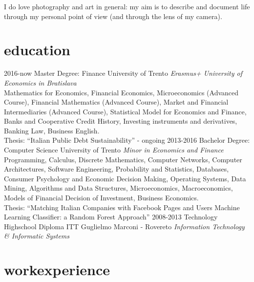 \documentclass[]{friggeri-cv}
\begin{document}
I do love photography and art in general: my aim is to describe and document life through my personal point of view (and through the lens of my camera).

\section{education}

\begin{entrylist}

\entry
    {2016-now}
    {Master Degree: Finance}
    {University of Trento}
    {\emph{Erasmus+ University of Economics in Bratislava}\\
    Mathematics for Economics, Financial Economics, Microeconomics (Advanced Course), Financial Mathematics (Advanced Course),
    Market and Financial Intermediaries (Advanced Course), Statistical Model for Economics and Finance,
    Banks and Cooperative Credit History, Investing instruments and derivatives, Banking Law, Business English.\\
    Thesis: “Italian Public Debt Sustainability” - ongoing
    }
\entry
    {2013-2016}
    {Bachelor Degree: Computer Science}
    {University of Trento}
    {\emph{Minor in Economics and Finance}
    Programming, Calculus, Discrete Mathematics, Computer Networks, Computer Architectures, Software Engineering,
    Probability and Statistics, Databases, Consumer Psychology and Economic Decision Making, Operating Systems,
    Data Mining, Algorithms and Data Structures, Microeconomics, Macroeconomics, Models of Financial Decision of Investment,
    Business Economics.\\
    Thesis: “Matching Italian Companies with Facebook Pages and Users Machine Learning Classifier: a Random Forest Approach”
    }
\entry
    {2008-2013}
    {Technology Highschool Diploma}
    {ITT Guglielmo Marconi - Rovereto}
    {\emph{Information Technology \& Informatic Systems}}

\end{entrylist}

\section{workexperience}
\end{document}
